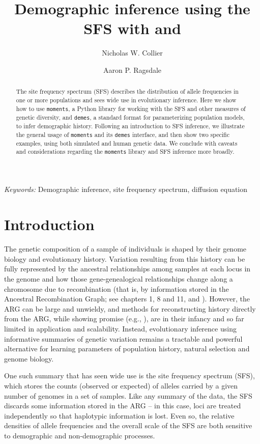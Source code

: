 \documentclass[]{article}
\title{Demographic inference using the SFS with \moments and \demes}
\author[1]{Nicholas W. Collier}
\author[1,*]{Aaron P. Ragsdale}
\affil[1]{Department of Integrative Biology, University of Wisconsin--Madison}
\affil[*]{apragsdale@wisc.edu}
\affil[ ]{ORCID IDs: 0009-0005-0385-9798 (NWC), 0000-0003-0715-3432 (APR)}
\newcommand{\moments}{\texttt{moments}\xspace}
\newcommand{\demes}{\texttt{demes}\xspace}
\begin{document}
\linenumbers
\doublespacing

\maketitle

\begin{abstract}

    The site frequency spectrum (SFS) describes the distribution of allele
    frequencies in one or more populations and sees wide use in evolutionary
    inference. Here we show how to use \moments, a Python library for working
    with the SFS and other measures of genetic diversity, and \demes, a
    standard format for parameterizing population models, to infer demographic
    history. Following an introduction to SFS inference, we illustrate the
    general usage of \moments and its \demes interface, and then show two
    specific examples, using both simulated and human genetic data. We conclude
    with caveats and considerations regarding the \moments library and SFS
    inference more broadly.

\end{abstract}

\emph{Keywords:} Demographic inference, site frequency spectrum, diffusion
equation

\section*{Introduction}

The genetic composition of a sample of individuals is shaped by their genome
biology and evolutionary history. Variation resulting from this history can be
fully represented by the ancestral relationships among samples at each locus in
the genome and how those gene-genealogical relationships change along a
chromosome due to recombination (that is, by information stored in the
Ancestral Recombination Graph; see chapters 1, 8 and 11, and
\cite{nielsen2025inference}). However, the ARG can be large and unwieldy, and
methods for reconstructing history directly from the ARG, while showing promise
(e.g., \cite{yc2022evaluation, fan2023likelihood, brandt2024promise}), are in
their infancy and so far limited in application and scalability. Instead,
evolutionary inference using informative summaries of genetic variation remains
a tractable and powerful alternative for learning parameters of population
history, natural selection and genome biology.

One such summary that has seen wide use is the site frequency spectrum (SFS),
which stores the counts (observed or expected) of alleles carried by a given
number of genomes in a set of samples. Like any summary of the data, the SFS
discards some information stored in the ARG -- in this case, loci are treated
independently so that haplotypic information is lost. Even so, the relative
densities of allele frequencies and the overall scale of the SFS are both
sensitive to demographic and non-demographic processes.
\end{document}
